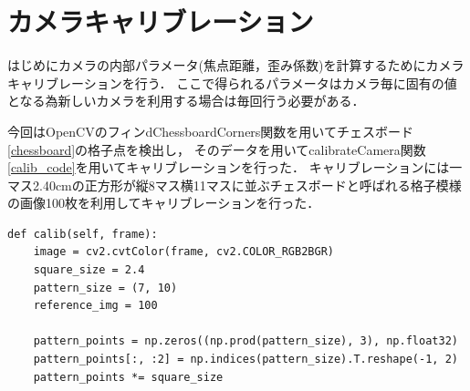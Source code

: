 \section{カメラキャリブレーション}
\label{calib}

はじめにカメラの内部パラメータ(焦点距離，歪み係数)を計算するためにカメラキャリブレーションを行う．
ここで得られるパラメータはカメラ毎に固有の値となる為新しいカメラを利用する場合は毎回行う必要がある．

今回はOpenCVのフィンdChessboardCorners関数を用いてチェスボード\ref{chessboard}の格子点を検出し，
そのデータを用いてcalibrateCamera関数\ref{calib_code}を用いてキャリブレーションを行った．
キャリブレーションには一マス2.40cmの正方形が縦8マス横11マスに並ぶチェスボードと呼ばれる格子模様の画像100枚を利用してキャリブレーションを行った．

\begin{lstlisting}[caption=calibration code,label=calib_code]
def calib(self, frame):                                                                                                                                      
    image = cv2.cvtColor(frame, cv2.COLOR_RGB2BGR)                                                                                                           
    square_size = 2.4                                                                                                                                        
    pattern_size = (7, 10)                                                                                                                                   
    reference_img = 100                                                                                                                                      
                                                                                                                                                            
    pattern_points = np.zeros((np.prod(pattern_size), 3), np.float32)                                                                                        
    pattern_points[:, :2] = np.indices(pattern_size).T.reshape(-1, 2)                                                                                        
    pattern_points *= square_size                                                                                                                            
                                                                                                                                                            

\end{lstlisting}
